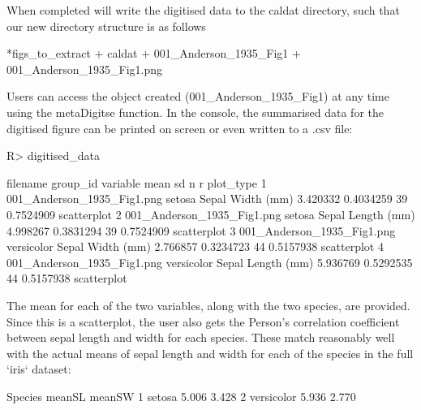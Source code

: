 \documentclass[article]{jss}
\begin{document}
When completed  will write the digitised data to the caldat directory, such that our new directory structure is as follows

\begin{CodeChunk}
\begin{CodeOutput}
*figs_to_extract
    + caldat
        + 001_Anderson_1935_Fig1
    + 001_Anderson_1935_Fig1.png
\end{CodeOutput}
\end{CodeChunk}

Users can access the  object created (001\_Anderson\_1935\_Fig1) at any time using the metaDigitse function. In the  console, the summarised data for the digitised figure can be printed on screen or even written to a .csv file:

\begin{CodeChunk}
\begin{CodeInput}
R> digitised_data
\end{CodeInput}
\begin{CodeOutput}
 filename   group_id         variable       mean      sd  n         r  plot_type
1 001_Anderson_1935_Fig1.png     setosa  Sepal Width (mm) 3.420332 0.4034259 39 0.7524909 scatterplot
2 001_Anderson_1935_Fig1.png     setosa Sepal Length (mm) 4.998267 0.3831294 39 0.7524909 scatterplot
3 001_Anderson_1935_Fig1.png versicolor  Sepal Width (mm) 2.766857 0.3234723 44 0.5157938 scatterplot
4 001_Anderson_1935_Fig1.png versicolor Sepal Length (mm) 5.936769 0.5292535 44 0.5157938 scatterplot
\end{CodeOutput}
\end{CodeChunk}

The mean for each of the two variables, along with the two species, are provided. Since this is a scatterplot, the user also gets the Person's correlation coefficient between sepal length and width for each species. These match reasonably well with the actual means of sepal length and width for each of the species in the full `iris` dataset:

\begin{CodeChunk}
\begin{CodeOutput}
     Species meanSL meanSW
1     setosa  5.006  3.428
2 versicolor  5.936  2.770
\end{CodeOutput}
\end{CodeChunk}
\end{document}
